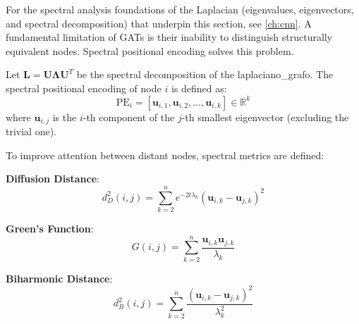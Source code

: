 For the spectral analysis foundations of the Laplacian (eigenvalues, eigenvectors, and spectral decomposition) that underpin this section, see \autoref{ch:cnn}. A fundamental limitation of \glspl{GAT} is their inability to distinguish structurally equivalent nodes. Spectral positional encoding solves this problem.

\begin{definition}\label{def:spectral_positional_encoding}
Let $\mathbf{L} = \mathbf{U}\mathbf{\Lambda}\mathbf{U}^T$ be the spectral decomposition of the \gls{laplaciano_grafo}. The spectral positional encoding of node $i$ is defined as:
\begin{equation}
    \text{PE}_i = [\mathbf{u}_{i,1}, \mathbf{u}_{i,2}, \ldots, \mathbf{u}_{i,k}] \in \mathbb{R}^k
    \label{eq:spectral_positional_encoding}
\end{equation}
where $\mathbf{u}_{i,j}$ is the $i$-th component of the $j$-th smallest eigenvector (excluding the trivial one).
\end{definition}

\begin{definition}\label{def:spectral_distances_attention}
To improve attention between distant nodes, spectral metrics are defined:

\textbf{Diffusion Distance}:
\begin{equation}
    d_D^2(i,j) = \sum_{k=2}^{n} e^{-2t\lambda_k} (\mathbf{u}_{i,k} - \mathbf{u}_{j,k})^2
    \label{eq:diffusion_distance}
\end{equation}

\textbf{Green's Function}:
\begin{equation}
    G(i,j) = \sum_{k=2}^{n} \frac{\mathbf{u}_{i,k} \mathbf{u}_{j,k}}{\lambda_k}
    \label{eq:green_function_distance}
\end{equation}

\textbf{Biharmonic Distance}:
\begin{equation}
    d_B^2(i,j) = \sum_{k=2}^{n} \frac{(\mathbf{u}_{i,k} - \mathbf{u}_{j,k})^2}{\lambda_k^2}
    \label{eq:biharmonic_distance}
\end{equation}
\end{definition}

